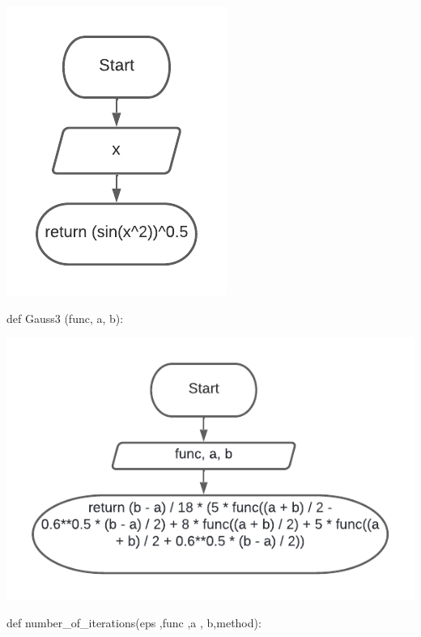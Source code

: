 \includegraphics[scale=0.75]{block1.pdf}

def Gauss3 (func, a, b):

\includegraphics[scale=0.75]{block2.pdf}


def number\_of\_iterations(eps ,func ,a , b,method):

